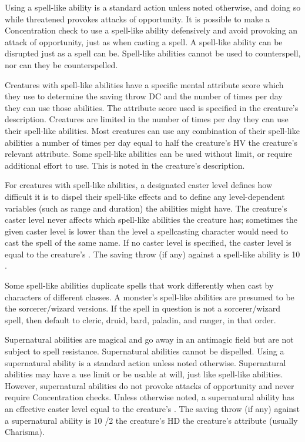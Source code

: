 Using a spell-like ability is a standard action unless noted otherwise, and doing so while threatened provokes attacks of opportunity. It is possible to make a Concentration check to use a spell-like ability defensively and avoid provoking an attack of opportunity, just as when casting a spell. A spell-like ability can be disrupted just as a spell can be. Spell-like abilities cannot be used to counterspell, nor can they be counterspelled.

Creatures with spell-like abilities have a specific mental attribute score which they use to determine the saving throw DC and the number of times per day they can use those abilities. The attribute score used is specified in the creature's description. Creatures are limited in the number of times per day they can use their spell-like abilities. Most creatures can use any combination of their spell-like abilities a number of times per day equal to half the creature's HV \add the creature's relevant attribute. Some spell-like abilities can be used without limit, or require additional effort to use. This is noted in the creature's description.

For creatures with spell-like abilities, a designated caster level defines how difficult it is to dispel their spell-like effects and to define any level-dependent variables (such as range and duration) the abilities might have. The creature's caster level never affects which spell-like abilities the creature has; sometimes the given caster level is lower than the level a spellcasting character would need to cast the spell of the same name. If no caster level is specified, the caster level is equal to the creature's . The saving throw (if any) against a spell-like ability is 10 \add {} \add {}.

Some spell-like abilities duplicate spells that work differently when cast by characters of different classes. A monster's spell-like abilities are presumed to be the sorcerer/wizard versions. If the spell in question is not a sorcerer/wizard spell, then default to cleric, druid, bard, paladin, and ranger, in that order.

 Supernatural abilities are magical and go away in an antimagic field but are not subject to spell resistance. Supernatural abilities cannot be dispelled. Using a supernatural ability is a standard action unless noted otherwise. Supernatural abilities may have a use limit or be usable at will, just like spell-like abilities. However, supernatural abilities do not provoke attacks of opportunity and never require Concentration checks. Unless otherwise noted, a supernatural ability has an effective caster level equal to the creature's . The saving throw (if any) against a supernatural ability is 10 /2 the creature's HD \add the creature's attribute (usually Charisma).

